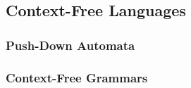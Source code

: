 \subsection{Context-Free Languages}\label{subsec:context-free}
\subsubsection{Push-Down Automata}
\subsubsection{Context-Free Grammars}